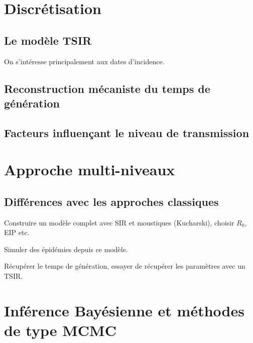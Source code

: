 \section{Discrétisation}

\subsection{Le modèle TSIR}

On s'intéresse principalement aux dates d'incidence.

\subsection{Reconstruction mécaniste du temps de génération}

\subsection{Facteurs influençant le niveau de transmission}

\section{Approche multi-niveaux}

\subsection{Différences avec les approches classiques}

Construire un modèle complet avec SIR et moustiques (Kucharski), choisir $R_0$, EIP etc.

Simuler des épidémies depuis ce modèle.

Récupérer le temps de génération, essayer de récupérer les paramètres avec un TSIR.

\section{Inférence Bayésienne et méthodes de type MCMC}
\label{sec:infbay}

